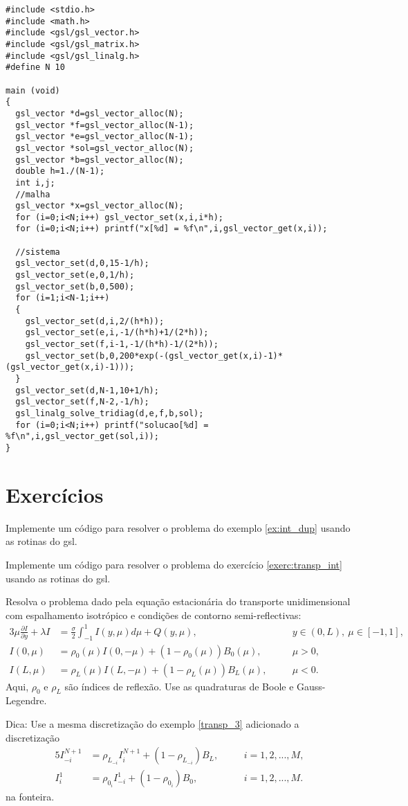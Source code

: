 \begin{verbatim}
#include <stdio.h>
#include <math.h>
#include <gsl/gsl_vector.h>
#include <gsl/gsl_matrix.h>
#include <gsl/gsl_linalg.h>
#define N 10

main (void)
{
  gsl_vector *d=gsl_vector_alloc(N);
  gsl_vector *f=gsl_vector_alloc(N-1);
  gsl_vector *e=gsl_vector_alloc(N-1);
  gsl_vector *sol=gsl_vector_alloc(N);
  gsl_vector *b=gsl_vector_alloc(N);
  double h=1./(N-1);
  int i,j;
  //malha
  gsl_vector *x=gsl_vector_alloc(N);
  for (i=0;i<N;i++) gsl_vector_set(x,i,i*h);  
  for (i=0;i<N;i++) printf("x[%d] = %f\n",i,gsl_vector_get(x,i));
  
  //sistema
  gsl_vector_set(d,0,15-1/h);
  gsl_vector_set(e,0,1/h);
  gsl_vector_set(b,0,500);
  for (i=1;i<N-1;i++) 
  {
    gsl_vector_set(d,i,2/(h*h));
    gsl_vector_set(e,i,-1/(h*h)+1/(2*h));
    gsl_vector_set(f,i-1,-1/(h*h)-1/(2*h));
    gsl_vector_set(b,0,200*exp(-(gsl_vector_get(x,i)-1)*(gsl_vector_get(x,i)-1)));
  }
  gsl_vector_set(d,N-1,10+1/h);
  gsl_vector_set(f,N-2,-1/h);
  gsl_linalg_solve_tridiag(d,e,f,b,sol);
  for (i=0;i<N;i++) printf("solucao[%d] = %f\n",i,gsl_vector_get(sol,i));
}
\end{verbatim}

\section{Exercícios}
\begin{exer}
 Implemente um código para resolver o problema do exemplo \ref{ex:int_dup} usando as rotinas do gsl.
\end{exer}
\begin{exer}
 Implemente um código para resolver o problema do exercício \ref{exerc:transp_int} usando as rotinas do gsl.
\end{exer}


\begin{exer}
Resolva o problema dado pela equação estacionária do transporte unidimensional com espalhamento isotrópico e condições de contorno semi-reflectivas:
\begin{alignat*}{3}
\mu\frac{\partial I}{\partial y}+\lambda I&=\frac{\sigma}{2}\int_{-1}^1 I(y,\mu)d\mu+Q(y,\mu), & &y\in (0,L),\ \mu\in[-1,1],\\
I(0,\mu)&=\rho_0(\mu)I(0,-\mu)+ (1-\rho_0(\mu))B_0(\mu), & &\mu>0,\\
I(L,\mu)&=\rho_L(\mu)I(L,-\mu)+ (1-\rho_L(\mu))B_L(\mu), &\quad &\mu<0.
\end{alignat*}
Aqui, $\rho_0$ e $\rho_L$ são índices de reflexão. Use as quadraturas de Boole e Gauss-Legendre.

Dica: Use a mesma discretização do exemplo \ref{transp_3} adicionado a discretização
\begin{alignat*}{5}
I_{-i}^{N+1}&=\rho_{L_{-i}} I_{i}^{N+1}+(1-\rho_{L_{-i}}) B_L, &\quad &i=1,2,...,M,\\
I_i^1&=\rho_{0{_i}}I_{-i}^1+(1-\rho_{0{_i}}) B_0, & &i=1,2,...,M.
\end{alignat*}
na fonteira.

\end{exer}


